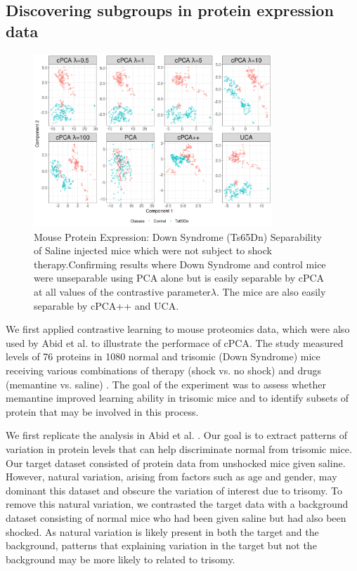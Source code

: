 \documentclass[12pt]{article}
\begin{document}
\subsection{Discovering subgroups in protein expression data}
\begin{figure}[th!]
  \centering
  \includegraphics[width = 0.8\textwidth]{figure/Mouse_Data.png}
  \caption{Mouse Protein Expression: Down Syndrome (Ts65Dn) Separability of Saline injected mice which were not subject to shock therapy.Confirming \cite{Abid} results where Down Syndrome and control mice were unseparable using PCA alone but is easily separable by cPCA at all values of the contrastive parameter$\lambda$. The mice are also easily separable by cPCA++ and UCA.}
  \label{fig:Mouse}
\end{figure}


We first applied contrastive learning to mouse proteomics data, which were also used by Abid et al. \cite{Abid} to illustrate the performace of cPCA. The study measured levels of 76 proteins in 1080 normal and trisomic (Down Syndrome) mice receiving various combinations of therapy (shock vs. no shock) and drugs (memantine vs. saline) \cite{Ahmed, Higuera, Abid}. The goal of the experiment was to assess whether memantine improved learning ability in trisomic mice and to identify subsets of protein that may be involved in this process.

We first replicate the analysis in Abid et al. \cite{Abid}. Our goal is to extract patterns of variation in protein levels that can help discriminate normal from trisomic mice. Our target dataset consisted of protein data from unshocked mice given saline. However, natural variation, arising from factors such as age and gender, may dominant this dataset and obscure the variation of interest due to trisomy. To remove this natural variation, we contrasted the target data with a background dataset consisting of normal mice who had been given saline but had also been shocked. As natural variation is likely present in both the target and the background, patterns that explaining variation in the target but not the background may be more likely to related to trisomy.
\end{document}
